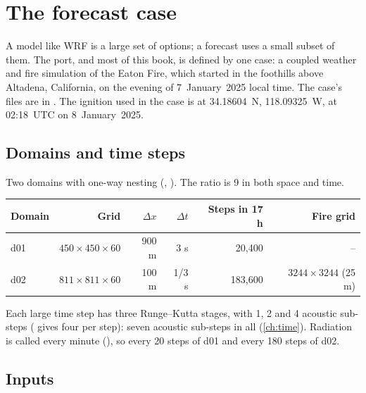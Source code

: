\chapter{The forecast case}\label{ch:case}

A model like WRF is a large set of options; a forecast uses a small subset of them. The port, and most of this book,
is defined by one case: a coupled weather and fire simulation of the Eaton Fire, which started in the foothills above
Altadena, California, on the evening of 7~January~2025 local time. The case's files are in
. The ignition used in the case is at 34.18604~N, 118.09325~W, at 02:18~UTC on
8~January~2025.

\section{Domains and time steps}

Two domains with one-way nesting (, ). The ratio is 9 in both space and
time.

\begin{center}
\begin{tabular}{lrrrrr}
\toprule
Domain & Grid & $\Delta x$ & $\Delta t$ & Steps in 17 h & Fire grid \\
\midrule
d01 & $450\times450\times60$ & 900 m & 3 s & 20{,}400 & -- \\
d02 & $811\times811\times60$ & 100 m & 1/3 s & 183{,}600 & $3244\times3244$ (25 m) \\
\bottomrule
\end{tabular}
\end{center}

Each large time step has three Runge--Kutta stages, with 1, 2 and 4 acoustic sub-steps
( gives four per step): seven acoustic sub-steps in all (\cref{ch:time}). Radiation is
called every minute (), so every 20 steps of d01 and every 180 steps of d02.

\section{Inputs}

